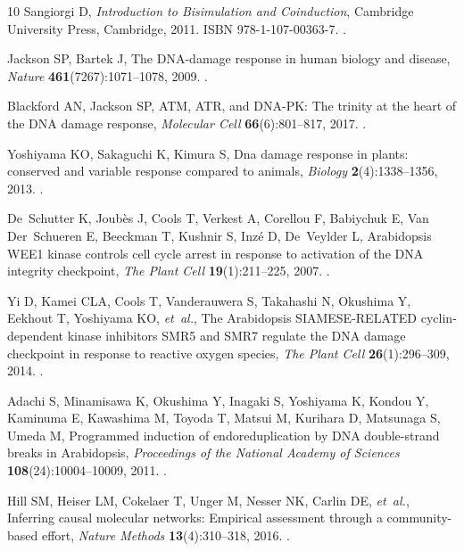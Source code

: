\documentclass{ws-jbcb}
\numberwithin{equation}{section}
\begin{document}
\begin{thebibliography}{10}
Sangiorgi D, \emph{Introduction to Bisimulation and Coinduction}, Cambridge
  University Press, Cambridge, 2011.
\newblock ISBN 978-1-107-00363-7.
\newblock {}.

Jackson SP, Bartek J, The {DNA}-damage response in human biology and disease,
  \emph{Nature} \textbf{461}(7267):1071--1078, 2009.
\newblock {}.

Blackford AN, Jackson SP, {ATM}, {ATR}, and {DNA-PK}: The trinity at the heart
  of the {DNA} damage response, \emph{Molecular Cell} \textbf{66}(6):801--817,
  2017.
\newblock {}.

Yoshiyama KO, Sakaguchi K, Kimura S, Dna damage response in plants: conserved
  and variable response compared to animals, \emph{Biology}
  \textbf{2}(4):1338--1356, 2013.
\newblock {}.

De~Schutter K, Joub{\`e}s J, Cools T, Verkest A, Corellou F, Babiychuk E, Van
  Der~Schueren E, Beeckman T, Kushnir S, Inz{\'e} D, De~Veylder L,
  {Arabidopsis} {WEE1} kinase controls cell cycle arrest in response to
  activation of the {DNA} integrity checkpoint, \emph{The Plant Cell}
  \textbf{19}(1):211--225, 2007.
\newblock {}.

Yi D, Kamei CLA, Cools T, Vanderauwera S, Takahashi N, Okushima Y, Eekhout T,
  Yoshiyama KO, \emph{et~al.}, The {Arabidopsis} {SIAMESE-RELATED}
  cyclin-dependent kinase inhibitors {SMR5} and {SMR7} regulate the {DNA}
  damage checkpoint in response to reactive oxygen species, \emph{The Plant
  Cell} \textbf{26}(1):296--309, 2014.
\newblock {}.

Adachi S, Minamisawa K, Okushima Y, Inagaki S, Yoshiyama K, Kondou Y, Kaminuma
  E, Kawashima M, Toyoda T, Matsui M, Kurihara D, Matsunaga S, Umeda M,
  Programmed induction of endoreduplication by {DNA} double-strand breaks in
  {Arabidopsis}, \emph{Proceedings of the National Academy of Sciences}
  \textbf{108}(24):10004--10009, 2011.
\newblock {}.

Hill SM, Heiser LM, Cokelaer T, Unger M, Nesser NK, Carlin DE, \emph{et~al.},
  Inferring causal molecular networks: Empirical assessment through a
  community-based effort, \emph{Nature Methods} \textbf{13}(4):310--318, 2016.
\newblock {}.


\end{thebibliography}
\end{document}
